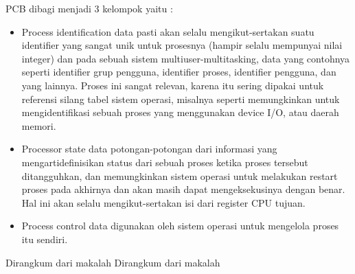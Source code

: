 	PCB dibagi menjadi 3 kelompok yaitu :
	\begin{itemize}
		\item Process identification data
		pasti akan selalu mengikut-sertakan suatu identifier yang sangat unik untuk prosesnya (hampir selalu mempunyai nilai integer) dan pada sebuah sistem multiuser-multitasking, data yang contohnya seperti identifier grup pengguna, identifier proses, identifier pengguna, dan yang lainnya. Proses ini sangat relevan, karena itu sering dipakai untuk referensi silang tabel sistem operasi, misalnya seperti memungkinkan untuk mengidentifikasi sebuah proses yang menggunakan device I/O, atau daerah memori.
		\item Processor state data
		potongan-potongan dari informasi yang mengartidefinisikan status dari sebuah proses ketika proses tersebut ditangguhkan, dan memungkinkan sistem operasi untuk melakukan restart proses pada akhirnya dan akan masih dapat mengeksekusinya dengan benar. Hal ini akan selalu mengikut-sertakan isi dari register CPU tujuan.
		\item Process control data
		digunakan oleh sistem operasi untuk mengelola proses itu sendiri.
	\end{itemize}
Dirangkum dari makalah \cite{apriyanto2009sistem}
Dirangkum dari makalah \cite{silberschatz2014operating}